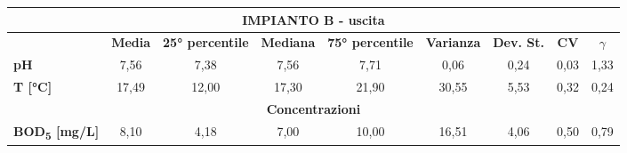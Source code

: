 \begin{sidewaystable}[h]
	\scriptsize
	\begin{center}

	\begin{tabular}{lcccccccc}
		\hline
		\multicolumn{9}{|c|}{\textbf{IMPIANTO B - uscita}}                                                                                                                                                                                                                                                                                                                                             \\ \hline
		\multicolumn{1}{l|}{}                                   & \multicolumn{1}{c|}{\textbf{Media}} & \multicolumn{1}{c|}{\textbf{25° percentile}} & \multicolumn{1}{c|}{\textbf{Mediana}} & \multicolumn{1}{c|}{\textbf{75° percentile}} & \multicolumn{1}{c|}{\textbf{Varianza}} & \multicolumn{1}{c|}{\textbf{Dev. St.}} & \multicolumn{1}{c|}{\textbf{CV}} & \multicolumn{1}{c|}{\textbf{$\gamma$}} \\ \hline
		\multicolumn{1}{|l|}{\textbf{pH}}                       & \multicolumn{1}{c|}{7,56}           & \multicolumn{1}{c|}{7,38}                    & \multicolumn{1}{c|}{7,56}             & \multicolumn{1}{c|}{7,71}                    & \multicolumn{1}{c|}{0,06}              & \multicolumn{1}{c|}{0,24}              & \multicolumn{1}{c|}{0,03}        & \multicolumn{1}{c|}{1,33}           \\ \hline
		\multicolumn{1}{|l|}{\textbf{T {[}°C{]}}}              & \multicolumn{1}{c|}{17,49}          & \multicolumn{1}{c|}{12,00}                   & \multicolumn{1}{c|}{17,30}            & \multicolumn{1}{c|}{21,90}                   & \multicolumn{1}{c|}{30,55}             & \multicolumn{1}{c|}{5,53}              & \multicolumn{1}{c|}{0,32}        & \multicolumn{1}{c|}{0,24}           \\ \hline
		\multicolumn{9}{|c|}{\textbf{Concentrazioni}}                                                                                                                                                                                                                                                                                                                                                  \\ \hline
		\multicolumn{1}{|l|}{\textbf{BOD\textsubscript{5} {[}mg/L{]}}}          & \multicolumn{1}{c|}{8,10}           & \multicolumn{1}{c|}{4,18}                    & \multicolumn{1}{c|}{7,00}             & \multicolumn{1}{c|}{10,00}                   & \multicolumn{1}{c|}{16,51}             & \multicolumn{1}{c|}{4,06}              & \multicolumn{1}{c|}{0,50}        & \multicolumn{1}{c|}{0,79}           \\ \hline

\end{tabular}
\end{center}
\end{sidewaystable}
